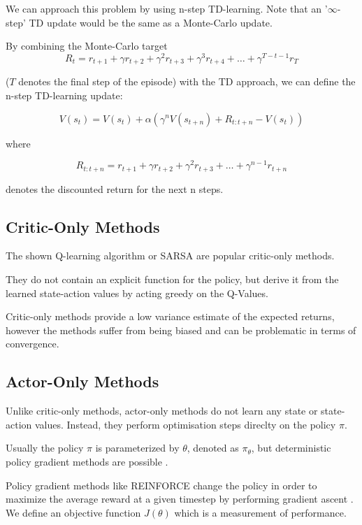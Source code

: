 We can approach this problem by using n-step TD-learning.
Note that an '$ \infty $-step' TD update would be the same as a Monte-Carlo update.

By combining the Monte-Carlo target
\begin{equation}
R_t = r_{t+1}+\gamma r_{t+2}+\gamma^2 r_{t+3}+\gamma^3 r_{t+4}+ \dots +\gamma^{T-t-1} r_{T}
\end{equation}

 ($T$ denotes the final step of the episode) with the TD approach, we can define the n-step TD-learning update:
 
\begin{equation}
V(s_t) = V(s_t) + \alpha(\gamma^nV(s_{t+n})+R_{t:t+n} - V(s_t))
\end{equation} 

where 

\begin{equation}
R_{t:t+n} = r_{t+1}+\gamma r_{t+2}+\gamma^2 r_{t+3}+ \dots +\gamma^{n-1} r_{t+n}
\end{equation}

denotes the discounted return for the next n steps.
\subsection{Critic-Only Methods}

The shown Q-learning algorithm or SARSA are popular critic-only methods.

They do not contain an explicit function for the policy, but derive it from the learned state-action values by acting greedy on the Q-Values.

Critic-only methods provide a low variance estimate of the expected returns, however the methods suffer from being biased and can be problematic in terms of convergence.

\subsection{Actor-Only Methods}

Unlike critic-only methods, actor-only methods do not learn any state or state-action values.
Instead, they perform optimisation steps direclty on the policy $\pi$.

Usually the policy $\pi$ is parameterized by $\theta$, denoted as $\pi_\theta$, but deterministic policy gradient methods are possible \citep{DDPG}. 

Policy gradient methods like REINFORCE change the policy in order to maximize the average reward at a given timestep by performing gradient ascent \citep{Williams1992}. 
We define an objective function $J(\theta)$ which is a measurement of performance.

